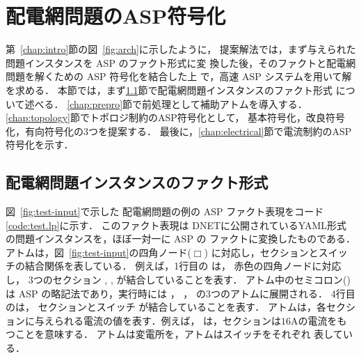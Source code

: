 ﻿\section{配電網問題のASP符号化}\label{chap:encode}

第~\ref{chap:intro}節の図~\ref{fig:arch}に示したように，
提案解法では，まず与えられた問題インスタンスを ASP のファクト形式に変
換した後，そのファクトと配電網問題を解くための ASP 符号化を結合した上
で，高速 ASP システム{\clingo}を用いて解を求める．
%
本節では，まず\ref{chap:fact}節で配電網問題インスタンスのファクト形式
について述べる．
\ref{chap:prepro}節で前処理として補助アトムを導入する．
\ref{chap:topology}節でトポロジ制約のASP符号化として，
基本符号化，改良符号化，有向符号化の3つを提案する．
最後に，\ref{chap:electrical}節で電流制約のASP符号化を示す．

\subsection{配電網問題インスタンスのファクト形式}\label{chap:fact}



図~\ref{fig:test-input}で示した
配電網問題の例の ASP ファクト表現をコード\ref{code:test.lp}に示す．
このファクト表現は
DNETに公開されているYAML形式の問題インスタンスを，ほぼ一対一に ASP の
ファクトに変換したものである．
%
アトムは，図~\ref{fig:test-input}の四角ノード($\Box$)
に対応し，セクションとスイッチの結合関係を表している．
例えば，1行目の
は，
赤色の四角ノードに対応し，
3つのセクション
, , 
が結合していることを表す．
アトム中のセミコロン(\code{;})は ASP の略記法であり，実行時には
，
，
の3つのアトムに展開される．
%
4行目のは，
セクションとスイッチ
が結合していることを表す．
%
アトムは，各セクションに与えられる電流の値を表す．例えば，
は，セクションは$16$Aの電流をもつことを意味する．
%
アトムは変電所を，アトムはスイッチをそれぞれ
表している．


